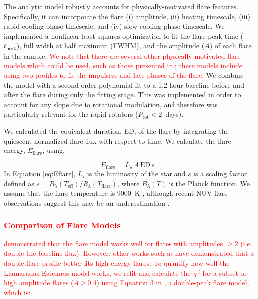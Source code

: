 \documentclass[twocolumn, linenumbers]{aastex631}
\begin{document}
The analytic model robustly  accounts for physically-motivated flare features.
Specifically, it can incorporate the flare (i) amplitude, (ii) heating timescale,
(iii) rapid cooling phase timescale, and (iv) slow cooling phase timescale. We
implemented a nonlinear least squares optimization to fit the flare peak time
($t_\textrm{peak}$), full width at half maximum (FWHM), and the amplitude ($A$)
of each flare in the sample. \textcolor{red}{We note that there are several other
physically-motivated flare models which could be used, such as those presented in
\cite{gryciuk17, pietras22, yang23_lp}; these models include using two profiles to
fit the impulsive and late phases of the flare.} We combine the model with a
second-order polynomial fit to a 1.2-hour baseline before and after the flare
during only the fitting stage. This was implemented in order to account for any
slope due to rotational modulation, and therefore was particularly relevant for the
rapid rotators ($P_\textrm{rot} < 2$~days).

We calculated the equivalent duration, ED, of the flare by integrating the
quiescent-normalized flare flux with respect to time. We calculate the flare
energy, $E_\textrm{flare}$, using,

\begin{equation}\label{eq:Eflare}
    E_\textrm{flare} = L_\star \, A \, \textrm{ED} \, s \, .
\end{equation}
In Equation \ref{eq:Eflare}, $L_\star$ is the luminosity of the star and $s$ is a
scaling factor defined as $s = B_\lambda(T_\textrm{eff}) / B_\lambda(T_\textrm{flare})$,
where $B_\lambda(T)$ is the Planck function. We assume that the flare temperature is
9000~K \citep{hawley92, hawley95}, although recent NUV flare observations suggest
this may be an underestimation \citep{kowalski19, brasseur23, berger23}.

\subsubsection{\textcolor{red}{Comparison of Flare Models}}

\textcolor{red}{\cite{tovar22} demonstrated that the flare model works well for
flares with amplitudes $\geq 2$ (i.e. double the baseline flux). However, other
works such as \cite{pietras22} have demonstrated that a double-flare profile better
fits high energy flares. To quantify how well the Llamaradas Estelares model works,
we refit and calculate the $\chi^2$ for a subset of high amplitude flares ($A \geq 0.4$)
using Equation 3 in \cite{pietras22}, a double-peak flare model, which is:}
\end{document}
